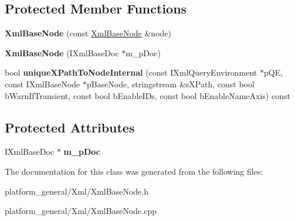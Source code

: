 \subsection*{\-Protected \-Member \-Functions}
\begin{DoxyCompactItemize}
\item 
\hypertarget{classgeneral__server_1_1XmlBaseNode_ab537150587854e1e287ed8e2670d0e40}{{\bfseries \-Xml\-Base\-Node} (const \hyperlink{classgeneral__server_1_1XmlBaseNode}{\-Xml\-Base\-Node} \&node)}\label{classgeneral__server_1_1XmlBaseNode_ab537150587854e1e287ed8e2670d0e40}

\item 
\hypertarget{classgeneral__server_1_1XmlBaseNode_ab19dfff147b068efeb85397e69a2a633}{{\bfseries \-Xml\-Base\-Node} (\-I\-Xml\-Base\-Doc $\ast$m\-\_\-p\-Doc)}\label{classgeneral__server_1_1XmlBaseNode_ab19dfff147b068efeb85397e69a2a633}

\item 
\hypertarget{classgeneral__server_1_1XmlBaseNode_a43dc5dc09a5c75b3d09bc2819f46391b}{bool {\bfseries unique\-X\-Path\-To\-Node\-Internal} (const \-I\-Xml\-Query\-Environment $\ast$p\-Q\-E, const \-I\-Xml\-Base\-Node $\ast$p\-Base\-Node, stringstream \&s\-X\-Path, const bool b\-Warn\-If\-Transient, const bool b\-Enable\-I\-Ds, const bool b\-Enable\-Name\-Axis) const }\label{classgeneral__server_1_1XmlBaseNode_a43dc5dc09a5c75b3d09bc2819f46391b}

\end{DoxyCompactItemize}
\subsection*{\-Protected \-Attributes}
\begin{DoxyCompactItemize}
\item 
\hypertarget{classgeneral__server_1_1XmlBaseNode_a0ddaa95982ae0f0db2d05cda67a7ad25}{\-I\-Xml\-Base\-Doc $\ast$ {\bfseries m\-\_\-p\-Doc}}\label{classgeneral__server_1_1XmlBaseNode_a0ddaa95982ae0f0db2d05cda67a7ad25}

\end{DoxyCompactItemize}


\-The documentation for this class was generated from the following files\-:\begin{DoxyCompactItemize}
\item 
platform\-\_\-general/\-Xml/\-Xml\-Base\-Node.\-h\item 
platform\-\_\-general/\-Xml/\-Xml\-Base\-Node.\-cpp\end{DoxyCompactItemize}
